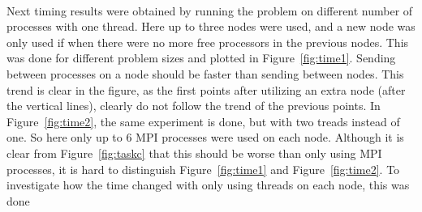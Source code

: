 \\
Next timing results were obtained by running the problem on different number of processes with one thread. Here up to three nodes were used, and a new node was only used if when there were no more free processors in the previous nodes. This was done for different problem sizes and plotted in Figure~\ref{fig:time1}. Sending between processes on a node should be faster than sending between nodes. This trend is clear in the figure, as the first points after utilizing an extra node (after the vertical lines), clearly do not follow the trend of the previous points. In Figure~\ref{fig:time2}, the same experiment is done, but with two treads instead of one. So here only up to 6 MPI processes were used on each node. Although it is clear from Figure~\ref{fig:taskc} that this should be worse than only using MPI processes, it is hard to distinguish Figure~\ref{fig:time1} and Figure~\ref{fig:time2}. To investigate how the time changed with only using threads on each node, this was done 
%
